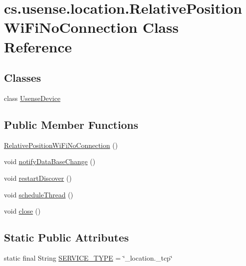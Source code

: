 \hypertarget{classcs_1_1usense_1_1location_1_1_relative_position_wi_fi_no_connection}{}\section{cs.\+usense.\+location.\+Relative\+Position\+Wi\+Fi\+No\+Connection Class Reference}
\label{classcs_1_1usense_1_1location_1_1_relative_position_wi_fi_no_connection}
\subsection*{Classes}
\begin{DoxyCompactItemize}
\item 
class \hyperlink{classcs_1_1usense_1_1location_1_1_relative_position_wi_fi_no_connection_1_1_usense_device}{Usense\+Device}
\end{DoxyCompactItemize}
\subsection*{Public Member Functions}
\begin{DoxyCompactItemize}
\item 
\hyperlink{classcs_1_1usense_1_1location_1_1_relative_position_wi_fi_no_connection_a31a736b7dec7b0204b89dea46bd6c23c}{Relative\+Position\+Wi\+Fi\+No\+Connection} ()
\item 
void \hyperlink{classcs_1_1usense_1_1location_1_1_relative_position_wi_fi_no_connection_a14446845fa199db8fa28b4e558e85aa4}{notify\+Data\+Base\+Change} ()
\item 
void \hyperlink{classcs_1_1usense_1_1location_1_1_relative_position_wi_fi_no_connection_a24e986c4e53725d787bda4ef3c2cc2dc}{restart\+Discover} ()
\item 
void \hyperlink{classcs_1_1usense_1_1location_1_1_relative_position_wi_fi_no_connection_a32e74b3ad72d081b90212b8fe6869797}{schedule\+Thread} ()
\item 
void \hyperlink{classcs_1_1usense_1_1location_1_1_relative_position_wi_fi_no_connection_a4aa26e6c5e3909b69f51008701be28a6}{close} ()
\end{DoxyCompactItemize}
\subsection*{Static Public Attributes}
\begin{DoxyCompactItemize}
\item 
static final String \hyperlink{classcs_1_1usense_1_1location_1_1_relative_position_wi_fi_no_connection_a78eb6cab0ee4a60280f77d69471d6181}{S\+E\+R\+V\+I\+C\+E\+\_\+\+T\+Y\+P\+E} = \char`\"{}\+\_\+location.\+\_\+tcp\char`\"{}
\end{DoxyCompactItemize}
